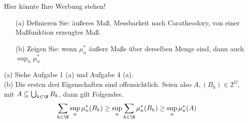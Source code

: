 \begin{exercise}

Hier könnte Ihre Werbung stehen!

\begin{itemize}
  \item[(a)] Definieren Sie: äußeres Maß, Messbarkeit nach Caratheodory, von einer Maßfunktion erzeugtes Maß.
  \item[(b)] Zeigen Sie: wenn $\mu^\ast_n$ äußere Maße über derselben Menge sind, dann auch $\sup_n \mu^\ast_n$
\end{itemize}

\end{exercise}


\begin{solution}

(a) Siehe Aufgabe 1 (a) und Aufgabe 4 (a). \\

(b) Die ersten drei Eigenschaften sind offensichtlich. Seien also $A, (B_k) \in 2^\Omega$, mit $A \subseteq \bigcup_{k \in \N} B_k$, dann gilt Folgendes.
\begin{align*}
  \sum_{k \in \N} \sup_n \mu^\ast_n(B_k)
  \geq
  \sup_n \sum_{k \in \N} \mu^\ast_n(B_k)
  \geq
  \sup_n \mu^\ast_n(A)
\end{align*}

\end{solution}
